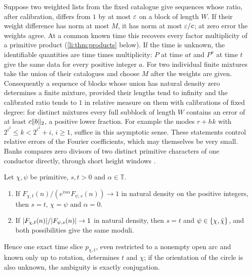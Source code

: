 Suppose two weighted lists from the fixed catalogue give sequences whose ratio, after calibration, differs from
$1$ by at most $\varepsilon$ on a block of length $W$. If their weight difference has norm at most $M$, it has norm at most
$\varepsilon/c$; at zero error the weights agree. At a common known time this recovers every factor multiplicity of a
primitive product (\cref{li:thm:products} below). If the time is unknown, the identifiable quantities are time times multiplicity: $P$ at time
$at$ and $P^a$ at time $t$ give the same data for every positive integer $a$. For two individual finite mixtures
take the union of their catalogues and choose $M$ after the weights are given. Consequently a sequence of blocks
whose union has natural density zero determines a finite mixture, provided their lengths tend to infinity and
the calibrated ratio tends to $1$ in relative measure on them with calibrations of fixed degree: for distinct
mixtures every full subblock of length $W$ contains an error of at least $c\lVert b\rVert_2$, a positive lower fraction. For
example the modes $r+hk$ with $2^{i^2}\le k<2^{i^2}+i$, $i\ge1$, suffice in this asymptotic sense. These statements control
relative errors of the Fourier coefficients, which may themselves be very small. Banks compares zero divisors
of two distinct primitive characters of one conductor directly, through short height windows
\cite{Banks2023Comparing}.

\begin{corollary}\label{rec:thm:liheat}
Let $\chi,\psi$ be primitive, $s,t>0$ and $\alpha\in\mathbb T$.
\begin{enumerate}
\item If $F_{\chi,t}(n)/(e^{in\alpha}F_{\psi,s}(n))\to1$ in natural density on the positive integers, then $s=t$, $\chi=\psi$ and $\alpha=0$.
\item If $\lvert F_{\chi,t}(n)\rvert/\lvert F_{\psi,s}(n)\rvert\to1$ in natural density, then $s=t$ and $\psi\in\{\chi,\bar\chi\}$, and both possibilities
give the same moduli.
\end{enumerate}
Hence one exact time slice $p_{\chi,t}$, even restricted to a nonempty open arc and known only up to
rotation, determines $t$ and $\chi$; if the orientation of the circle is also unknown, the ambiguity is
exactly conjugation.
\end{corollary}

